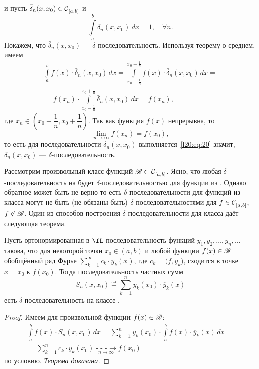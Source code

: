 и пусть $\bar{\delta}_n(x,x_0)\in\Cfn[{[a,b]}]{}$ и 
\begin{equation*}
	\int\limits_a^b \bar\delta_n(x,x_0)\,dx=1,\quad\forall n.
\end{equation*}
Покажем, что $\bar\delta_n(x,x_0)$ --- $\delta$-последовательность. Используя теорему о среднем, имеем
\begin{multline*}
	\int\limits_a^b f(x)\cdot\bar\delta_n(x,x_0)\,dx=\int\limits_{x_0-\frac{1}{n}}^{x_0+\frac{1}{n}} f(x)\cdot\bar\delta_n(x,x_0)\,dx=\\=f(x_n)\cdot\int\limits_{x_0-\frac{1}{n}}^{x_0+\frac{1}{n}}\bar\delta_n(x,x_0)\,dx=f(x_n),
\end{multline*}
где $x_n\in\left(x_0-\dfrac{1}{n},x_0+\dfrac{1}{n}\right)$. Так как функция $f(x)$ непрерывна, то 
\begin{equation*}
	\lim\limits_{n\to\infty}f(x_n)=f(x_0),
\end{equation*}
то есть для последовательности $\bar\delta_n(x,x_0)$ выполняется~\eqref{l20:eq:20} значит, $\bar\delta_n(x,x_0)$ --- $\delta$-последовательность.

Рассмотрим произвольный класс функций $\ms{B}\subset\Cfn[{[a,b]}]{}$. Ясно, что любая $\delta$-последовательность на \Cfn[{[a,b]}]{} будет $\delta$-последовательностью для функции из . Однако обратное может быть не верно то есть $\delta$-последовательности для функций из класса  могут не быть (не обязаны быть) $\delta$-последовательностями для $f\in\Cfn[{[a,b]}]{}$, $f\not\in\ms{B}$. Один из способов построения $\delta$-последовательности для класса  даёт следующая теорема.
\begin{Teor}\label{l20:teor:1}
	Пусть ортонормированная в $\fL$ последовательность функций $y_1,y_2,\ldots,y_n,\ldots$ такова, что для некоторой точки $x_0\in(a,b)$ и любой функции $f(x)\in\ms{B}$ обобщённый ряд Фурье $\displaystyle\sum\limits_{k=1}^{\infty}c_k\cdot y_k(x)$, где $c_k=\big(f,y_k\big)$, сходится в точке $x=x_0$ к $f(x_0)$. Тогда последовательность частных сумм
	\begin{equation}\label{l20:eq:21}
		S_n(x,x_0)\eqdef\sum\limits_{k=1}^{n}y_k(x_0)\cdot\overline{y}_k(x)
	\end{equation}
	есть $\delta$-последовательность на классе .
\end{Teor}
\begin{proof}
	Имеем для произвольной функции $f(x)\in\ms{B}$:
	\begin{multline*}
		\int\limits_a^b f(x)\cdot S_n(x,x_0)\,dx=\sum\limits_{k=1}^{n}y_k(x_0)\cdot\int\limits_a^b f(x)\cdot\overline{y}_k(x)\,dx=\\=\sum\limits_{k=1}^{n} c_k\cdot y_k(x_0)\mathop{-\!\!\!-\!\!\!-\!\!\!\longrightarrow}\limits_{n\to\infty}f(x_0)
	\end{multline*}
	по условию. \emph{Теорема доказана.}
\end{proof}

